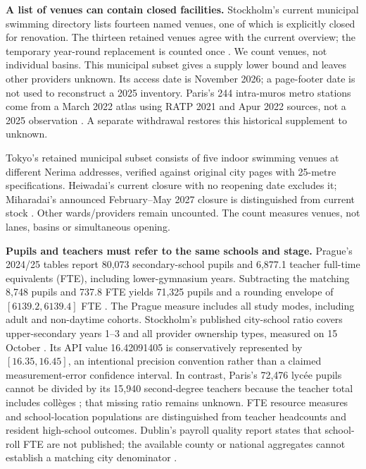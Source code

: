 \textbf{A list of venues can contain closed facilities.}
Stockholm's current municipal swimming directory lists fourteen named venues,
one of which is explicitly closed for renovation. The thirteen retained venues
agree with the current overview; the temporary year-round replacement is
counted once \cite{stockpool}. We count venues, not individual basins. This
municipal subset gives a supply lower bound and leaves other providers unknown.
Its access date is November 2026; a page-footer date is not used to reconstruct
a 2025 inventory. Paris's 244 intra-muros metro stations come from a March 2022
atlas using RATP 2021 and Apur 2022 sources, not a 2025 observation
\cite{apur}. A separate withdrawal restores this historical supplement to unknown.

Tokyo's retained municipal subset consists of five indoor swimming venues at different Nerima addresses, verified against original city pages with 25-metre specifications. Heiwadai's current closure with no reopening date excludes it; Miharadai's announced February--May 2027 closure is distinguished from current stock \cite{nerimapool,nerimaclose}. Other wards/providers remain uncounted. The count measures venues, not lanes, basins or simultaneous opening.

\textbf{Pupils and teachers must refer to the same schools and stage.}
Prague's 2024/25 tables report 80,073 secondary-school pupils and 6,877.1
teacher full-time equivalents (FTE), including lower-gymnasium years.
Subtracting the matching 8,748 pupils and 737.8 FTE yields 71,325 pupils and
a rounding envelope of $[6139.2,6139.4]$ FTE \cite{prague}. The Prague
measure includes all study modes, including adult and non-daytime cohorts.
Stockholm's
published city-school ratio covers upper-secondary years 1--3 and all provider
ownership types, measured on 15 October \cite{kolada}. Its API value
16.42091405 is conservatively represented by $[16.35,16.45]$, an intentional
precision convention rather than a claimed measurement-error confidence interval.
In contrast, Paris's 72,476 lyc\'ee pupils cannot be divided by its 15,940
second-degree teachers because the teacher total includes coll\`eges
\cite{parisedu}; that missing ratio remains unknown. FTE resource measures
and school-location populations are distinguished from teacher headcounts and
resident high-school outcomes. Dublin's payroll quality report states that school-roll FTE are not published; the available county or national aggregates cannot establish a matching city denominator \cite{irelandfte}.

